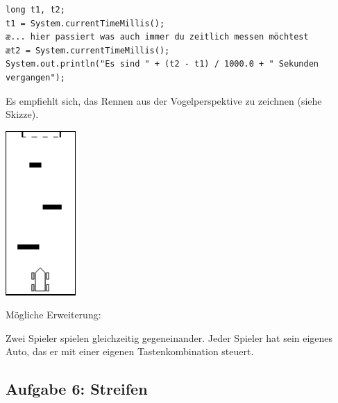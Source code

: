 \begin{lstlisting}
long t1, t2;
t1 = System.currentTimeMillis();
æ... hier passiert was auch immer du zeitlich messen möchtest
æt2 = System.currentTimeMillis();
System.out.println("Es sind " + (t2 - t1) / 1000.0 + " Sekunden vergangen");
\end{lstlisting}

Es empfiehlt sich, das Rennen aus der Vogelperspektive zu zeichnen (siehe Skizze).

\begin{center}
\includegraphics[width=0.2\textwidth]{./inf/SEKII/21_Java_Tastaturereignisse/Autorennen.png}
\end{center}

Mögliche Erweiterung:

Zwei Spieler spielen gleichzeitig gegeneinander. Jeder Spieler hat sein eigenes
Auto, das er mit einer eigenen Tastenkombination steuert.


\subsection{Aufgabe 6: Streifen}

